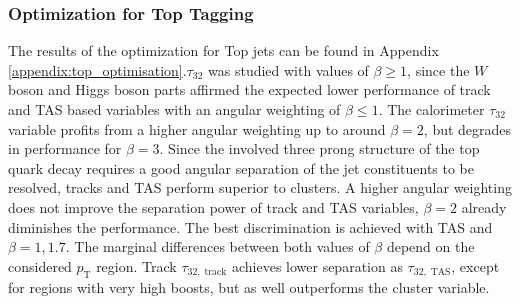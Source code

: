 \subsubsection{Optimization for Top Tagging}
The results of the optimization for Top jets can be found in Appendix \ref{appendix:top_optimisation}.$\tau_{32}$ was studied with values of $\beta \ge 1$,  since the $W$ boson and Higgs boson parts affirmed the expected lower performance of track and TAS based variables with an angular weighting of $\beta \le 1$. The calorimeter $\tau_{32}$ variable profits from a higher angular weighting up to around $\beta=2$, but degrades in performance for $\beta=3$. Since the involved three prong structure of the top quark decay requires a good angular separation of the jet constituents to be resolved, tracks and TAS perform superior to clusters. A higher angular weighting does not improve the separation power of track and TAS variables, $\beta=2$ already diminishes the performance. The best discrimination is achieved with TAS and $\beta=1,1.7$. The marginal differences between both values of $\beta$ depend on the considered $p_{\mathrm{T}}$ region. Track $\tau_{32,\;\text{track}}$ achieves lower separation as $\tau_{32,\;\text{TAS}}$, except for regions with very high boosts, but as well outperforms the cluster variable.

